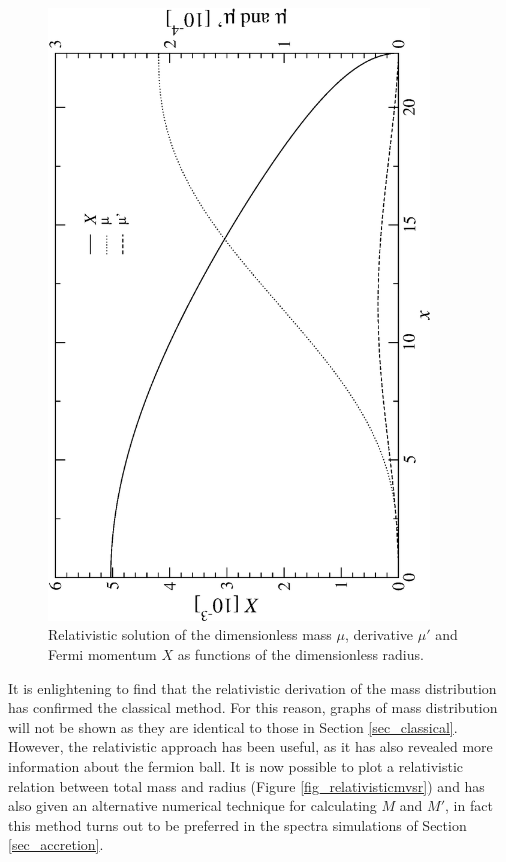 \begin{figure}[!p]
	\begin{center}
	\includegraphics[angle=-90,width=0.9\textwidth]{eps/relativisticsolution.eps}
	\caption{Relativistic solution of the dimensionless mass $\mu$, derivative $\mu'$ and Fermi momentum $X$ as functions of the
	dimensionless radius.}
	\label{fig_relativisticsolution}
	\end{center}
\end{figure}

It is enlightening to find that the relativistic derivation of the mass distribution has confirmed the classical method.
For this reason, graphs of mass
distribution will not be shown as they are identical to those in Section \ref{sec_classical}. However, the relativistic approach has been
useful, as it has also revealed more information about the fermion ball. It is now possible to plot a relativistic relation
between total mass and radius (Figure \ref{fig_relativisticmvsr}) and has also given an alternative numerical technique for calculating
$M$ and $M'$, in fact this method turns out to be preferred in the spectra simulations of Section \ref{sec_accretion}.

